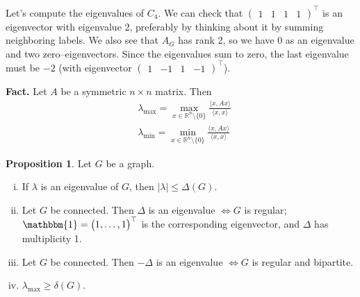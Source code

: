 \documentclass{article}
\theoremstyle{definition}
\newtheorem{prop}[theorem]{Proposition}
\begin{document}
Let's compute the eigenvalues of $C_4$. We can check that $\begin{pmatrix} 1&1&1&1 \end{pmatrix}^\top$ is an eigenvector with eigenvalue 2, preferably by thinking about it by summing neighboring labels. We also see that $A_G$ has rank 2, so we have 0 as an eigenvalue and two zero--eigenvectors. Since the eigenvalues sum to zero, the last eigenvalue must be $-2$ (with eigenvector $\begin{pmatrix} 1 & -1 & 1 & -1 \end{pmatrix}^\top$).
\vspace{1mm}

\textbf{Fact.} Let $A$ be a symmetric $n \times n$ matrix. Then 
\begin{align*}
    &\lambda_{\max} = \max_{x \in \mathbb{R}^n\setminus \{0\}} \frac{\langle x, Ax \rangle}{\langle x, x \rangle}\\
    &\lambda_{\min} = \min_{x \in \mathbb{R}^n\setminus \{0\}} \frac{\langle x, Ax \rangle}{\langle x, x \rangle}
\end{align*}
\begin{prop}\label{7.1}
    Let $G$ be a graph.
    \begin{enumerate}[(i)]
        \item If $\lambda$ is an eigenvalue of $G$, then $|\lambda|\le \Delta(G)$.
        \item Let $G$ be connected. Then $\Delta$ is an eigenvalue $\iff G$ is regular; $\mathbbm{1}=\begin{pmatrix} 1,\ldots,1 \end{pmatrix}^\top$ is the corresponding eigenvector, and $\Delta$ has multiplicity 1.
        \item Let $G$ be connected. Then $-\Delta$ is an eigenvalue $\iff G$ is regular and bipartite.
        \item $\lambda_{\max} \ge \delta(G)$.
    \end{enumerate}
\end{prop}
\end{document}
